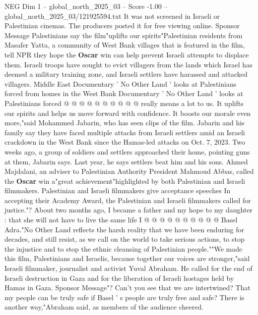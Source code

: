 \begin{textsample}{NEG Dim 1 – global\_north\_2025\_03 – Score -1.00 – global\_north\_2025\_03/121925594.txt}
It was not screened in Israeli or Palestinian cinemas.
The producers posted it for free viewing online.
Sponsor Message Palestinians say the film"uplifts our spirits"Palestinian residents from Masafer Yatta, a community of West Bank villages that is featured in the film, tell NPR they hope the \textbf{Oscar} win can help prevent Israeli attempts to displace them.
Israeli troops have sought to evict villagers from the lands which Israel has deemed a military training zone, and Israeli settlers have harassed and attacked villagers.
Middle East Documentary ' No Other Land ' looks at Palestinians forced from homes in the West Bank Documentary ' No Other Land ' looks at Palestinians forced @ @ @ @ @ @ @ @ @ @ really means a lot to us.
It uplifts our spirits and helps us move forward with confidence.
It boosts our morale even more,"said Mohammed Jabarin, who has seen clips of the film.
Jabarin and his family say they have faced multiple attacks from Israeli settlers amid an Israeli crackdown in the West Bank since the Hamas-led attacks on Oct. 7, 2023.
Two weeks ago, a group of soldiers and settlers approached their home, pointing guns at them, Jabarin says.
Last year, he says settlers beat him and his sons.
Ahmed Majdalani, an adviser to Palestinian Authority President Mahmoud Abbas, called the \textbf{Oscar} win a"great achievement"highlighted by both Palestinian and Israeli filmmakers.
Palestinian and Israeli filmmakers give acceptance speeches In accepting their Academy Award, the Palestinian and Israeli filmmakers called for justice."?
About two months ago, I became a father and my hope to my daughter : that she will not have to live the same life I @ @ @ @ @ @ @ @ @ @ Basel Adra."No Other Land reflects the harsh reality that we have been enduring for decades, and still resist, as we call on the world to take serious actions, to stop the injustice and to stop the ethnic cleansing of Palestinian people.""We made this film, Palestinians and Israelis, because together our voices are stronger,"said Israeli filmmaker, journalist and activist Yuval Abraham.
He called for the end of Israeli destruction in Gaza and for the liberation of Israeli hostages held by Hamas in Gaza.
Sponsor Message"?
Can't you see that we are intertwined?
That my people can be truly safe if Basel ' s people are truly free and safe?
There is another way,"Abraham said, as members of the audience cheered.

\end{textsample}

